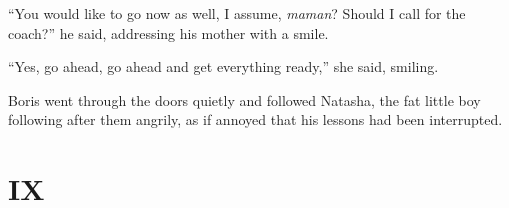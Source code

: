 ``You would like to go now as well, I assume, \textit{maman}? Should I call for the coach?'' he said, addressing his mother with a smile. %

``Yes, go ahead, go ahead and get everything ready,'' she said, smiling. %

Boris went through the doors quietly and followed Natasha, the fat little boy following after them angrily, as if annoyed that his lessons had been interrupted.

\section*{IX}
